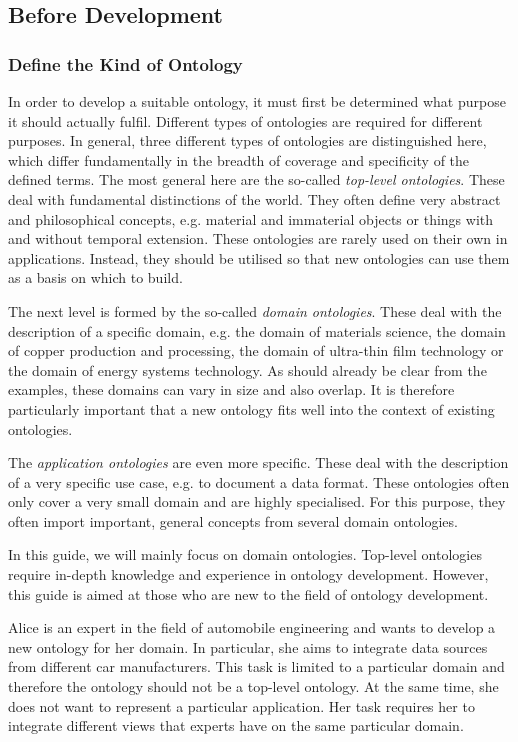 \subsection{Before Development}

\subsubsection{Define the Kind of Ontology}
\label{sssec:ontologykind}

In order to develop a suitable ontology, it must first be determined what purpose it should actually fulfil. Different types of ontologies are required for different purposes. In general, three different types of ontologies are distinguished here, which differ fundamentally in the breadth of coverage and specificity of the defined terms.
The most general here are the so-called \textit{top-level ontologies}. These deal with fundamental distinctions of the world. They often define very abstract and philosophical concepts, e.g. material and immaterial objects or things with and without temporal extension. These ontologies are rarely used on their own in applications. Instead, they should be utilised so that new ontologies can use them as a basis on which to build.

The next level is formed by the so-called \textit{domain ontologies}. These deal with the description of a specific domain, e.g. the domain of materials science, the domain of copper production and processing, the domain of ultra-thin film technology or the domain of energy systems technology. As should already be clear from the examples, these domains can vary in size and also overlap. It is therefore particularly important that a new ontology fits well into the context of existing ontologies.

The \textit{application ontologies} are even more specific. These deal with the description of a very specific use case, e.g. to document a data format. These ontologies often only cover a very small domain and are highly specialised. For this purpose, they often import important, general concepts from several domain ontologies.

In this guide, we will mainly focus on domain ontologies. Top-level ontologies require in-depth knowledge and experience in ontology development. However, this guide is aimed at those who are new to the field of ontology development.


\begin{example}
Alice is an expert in the field of automobile engineering and wants to develop a new ontology for her domain. In particular, she aims to integrate data sources from different car manufacturers. This task is limited to a particular domain and therefore the ontology should not be a top-level ontology. At the same time, she does not want to represent a particular application. Her task requires her to integrate different views that experts have on the same particular domain.


\end{example}

